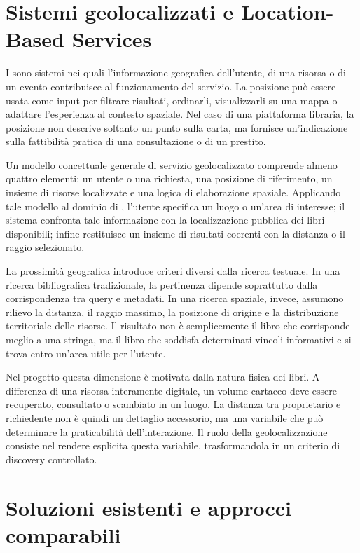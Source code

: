 \section{Sistemi geolocalizzati e Location-Based Services}
\label{sec:location-based-services}

I \locationbasedservices{} sono sistemi nei quali l'informazione geografica dell'utente, di una risorsa o di un evento contribuisce al funzionamento del servizio. La posizione può essere usata come input per filtrare risultati, ordinarli, visualizzarli su una mappa o adattare l'esperienza al contesto spaziale. Nel caso di una piattaforma libraria, la posizione non descrive soltanto un punto sulla carta, ma fornisce un'indicazione sulla fattibilità pratica di una consultazione o di un prestito.

Un modello concettuale generale di servizio geolocalizzato comprende almeno quattro elementi: un utente o una richiesta, una posizione di riferimento, un insieme di risorse localizzate e una logica di elaborazione spaziale. Applicando tale modello al dominio di \projectname{}, l'utente specifica un luogo o un'area di interesse; il sistema confronta tale informazione con la localizzazione pubblica dei libri disponibili; infine restituisce un insieme di risultati coerenti con la distanza o il raggio selezionato.

La prossimità geografica introduce criteri diversi dalla ricerca testuale. In una ricerca bibliografica tradizionale, la pertinenza dipende soprattutto dalla corrispondenza tra query e metadati. In una ricerca spaziale, invece, assumono rilievo la distanza, il raggio massimo, la posizione di origine e la distribuzione territoriale delle risorse. Il risultato non è semplicemente il libro che corrisponde meglio a una stringa, ma il libro che soddisfa determinati vincoli informativi e si trova entro un'area utile per l'utente.

Nel progetto questa dimensione è motivata dalla natura fisica dei libri. A differenza di una risorsa interamente digitale, un volume cartaceo deve essere recuperato, consultato o scambiato in un luogo. La distanza tra proprietario e richiedente non è quindi un dettaglio accessorio, ma una variabile che può determinare la praticabilità dell'interazione. Il ruolo della geolocalizzazione consiste nel rendere esplicita questa variabile, trasformandola in un criterio di discovery controllato.

\section{Soluzioni esistenti e approcci comparabili}
\label{sec:soluzioni-esistenti}

